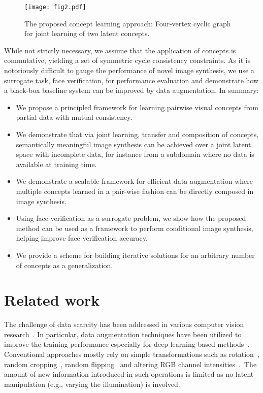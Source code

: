 \documentclass[10pt,twocolumn,letterpaper]{article}
\begin{document}
\begin{figure}[!t]
\begin{center}
\texttt{[image: fig2.pdf]}
\end{center}
   \caption{The proposed concept learning approach: Four-vertex cyclic graph for joint learning of two latent concepts.}
\vspace{-1.5em}
\label{fig:cyclicmodel}
\end{figure}

While not strictly necessary, we assume that the application of concepts is commutative, yielding a set of symmetric cycle consistency constraints. As it is notoriously difficult to gauge the performance of novel image synthesis, we use a surrogate task, face verification, for performance evaluation and demonstrate how a black-box baseline system can be improved by data augmentation. In summary:

\begin{itemize}
\setlength\itemsep{-0.3em}
\item We propose a principled framework for learning pairwise visual concepts from partial data with mutual consistency. 
\item We demonstrate that via joint learning, transfer and composition of concepts, semantically meaningful image synthesis can be achieved over a joint latent space with incomplete data, for instance from a subdomain where no data is available at training time.
\item We demonstrate a scalable framework for efficient data augmentation where multiple concepts learned in a pair-wise fashion can be directly composed in image synthesis. 
\item Using face verification as a surrogate problem, we show how the proposed method can be used as a framework to perform conditional image synthesis, helping improve face verification accuracy.
\item We provide a scheme for building iterative solutions for an arbitrary number of concepts as a generalization.
\end{itemize}

\section{Related work}

The challenge of data scarcity has been addressed in various computer vision research~\cite{data_scar1, data_scar2, kunpeng}. In particular, data augmentation techniques have been utilized to improve the training performance especially for deep learning-based methods~\cite{flipping, flipping2, cropping, pose_est}. Conventional approaches mostly rely on simple transformations such as rotation~\cite{bestprac}, random cropping~\cite{cropping}, random flipping~\cite{flipping,flipping2,cropping} and altering RGB channel intensities~\cite{altRGB}.~The amount of new information introduced in such operations is limited as no latent manipulation (e.g., varying the illumination) is involved.
\end{document}
